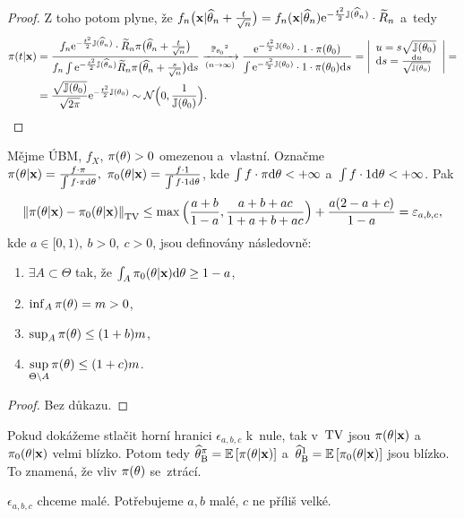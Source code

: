 \begin{dusl}
\begin{proof}
		Z toho potom plyne, že $f_n\big(\textbf{x}|\widehat{\theta}_n+\frac{t}{\sqrt{n}}\big)=f_n(\textbf{x}|\widehat{\theta}_n)\mathrm{e}^{-\frac{t^2}{2}\mathbb{J}(\widehat{\theta}_n)}\cdot\widetilde{R}_n$ a~tedy \[
		\begin{split}
		\pi(t|\textbf{x})&=\frac{f_n\e{-\frac{t^2}{2}\mathbb{J}(\htn)}\cdot\widetilde{R}_n \pi\big( \htn+\frac{t}{\sqrt{n}} \big)}{f_n\int \e{-\frac{s^2}{2}\mathbb{J}(\htn)}\widetilde{R}_n \pi\big(\htn+\frac{s}{\sqrt{n}}\big)\d s}\xrightarrow[(n\rightarrow \infty)]{\PP_{\t_0}\text{\footnotemark}}\frac{\e{-\frac{t^2}{2}\mathbb{J}(\t_0)}\cdot1\cdot \pi(\t_0)}{\int\e{-\frac{s^2}{2}\mathbb{J}(\t_0)}\cdot1\cdot\pi(\t_0)\d s}=\left| \begin{array}{l}
		u=s\sqrt{\mathbb{J}(\t_0)}\\\d s=\frac{\d u}{\sqrt{\mathbb{J}(\t_0)}}		
		\end{array}
		\right|=\\&=\frac{\sqrt{\mathbb{J}(\t_0)}}{\sqrt{2\pi}}\e{-\frac{t^2}{2}\mathbb{J}(\t_0)}\sim\NN\Big( 0,\frac{1}{\mathbb{J}(\t_0)} \Big).
		\end{split}
		\]
	\end{proof}
\end{dusl}
\begin{theorem}
	Mějme ÚBM, $f_X$, $\pi(\theta)>0$ omezenou a~vlastní. Označme $\pi(\theta|\textbf{x})=\frac{f\cdot\pi}{\int f\cdot\pi\mathrm{d}\theta},~\pi_0(\theta|\textbf{x})=\frac{f\cdot1}{\int f\cdot1 \mathrm{d}\theta}$, kde $\int f\cdot\pi\mathrm{d}\theta<+\infty$ a~$\int f\cdot1 \mathrm{d}\theta<+\infty$. Pak
	$$ \left\|\pi(\theta|\textbf{x})-\pi_0(\theta|\textbf{x})\right\|_{\mathrm{TV}}\leq \max\Big(\frac{a+b}{1-a},\frac{a+b+ac}{1+a+b+ac}\Big)+\frac{a(2-a+c)}{1-a}=\varepsilon_{a,b,c},$$
	kde $a\in[ 0,1),~b>0,~c>0$, jsou definovány následovně:\begin{enumerate}[1)]
		\item $\exists A\subset \Theta$ tak, že $\int_A \pi_0(\theta|\textbf{x})\mathrm{d}\theta\geq 1-a$,
		\item $\inf_A \pi(\theta)=m>0$,
		\item $\sup_A \pi(\theta)\leq (1+b)m$,
		\item $\sup\limits_{\Theta\setminus A} \pi(\theta)\leq(1+c)m$. 
	\end{enumerate}
\end{theorem}
\begin{proof}
	Bez důkazu.
\end{proof}
\begin{dusl}
	Pokud dokážeme stlačit horní hranici $\epsilon_{a,b,c}$ k~nule, tak v~$\mathrm{TV}$ jsou $\pi(\theta|\textbf{x})$ a~$\pi_0(\theta|\textbf{x})$ velmi blízko. Potom tedy $\widehat{\theta}_\mathrm{B}^\pi=\mathbb{E}\left[ \pi(\theta|\textbf{x}) \right]$ a~$\widehat{\theta}_\mathrm{B}^1=\mathbb{E}\left[ \pi_0(\theta|\textbf{x}) \right]$ jsou blízko. To znamená, že vliv $\pi(\theta)$ se~ztrácí.
\end{dusl}
\begin{remark}
	$\epsilon_{a,b,c}$ chceme malé. Potřebujeme $a,b$ malé, $c$ ne příliš velké.
\end{remark}



